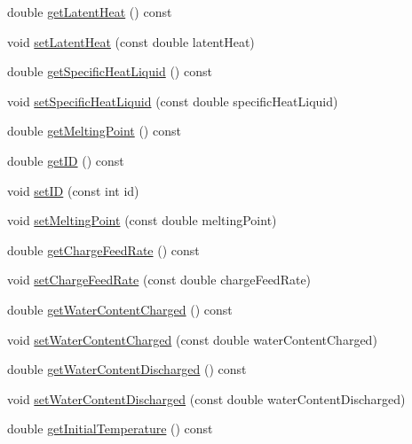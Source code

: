 \begin{DoxyCompactItemize}
double \hyperlink{class_solid_load_charge_material_add60191bd282a9cefa4bf7a60301711b}{get\+Latent\+Heat} () const
\item 
void \hyperlink{class_solid_load_charge_material_ac7361119ab7cc352dfbdc6fcb9175981}{set\+Latent\+Heat} (const double latent\+Heat)
\item 
double \hyperlink{class_solid_load_charge_material_a8b02308194b603276df3a894c401e923}{get\+Specific\+Heat\+Liquid} () const
\item 
void \hyperlink{class_solid_load_charge_material_a91fad347bf52a4f6695c304904091797}{set\+Specific\+Heat\+Liquid} (const double specific\+Heat\+Liquid)
\item 
double \hyperlink{class_solid_load_charge_material_a4be001f6e6ecbd2ad0ae1d154559cdb0}{get\+Melting\+Point} () const
\item 
double \hyperlink{class_solid_load_charge_material_ae34ce5c6f1f362340ead0748aaf885b8}{get\+ID} () const
\item 
void \hyperlink{class_solid_load_charge_material_a4cc8e12ffb340c94106cecf576a85ae5}{set\+ID} (const int id)
\item 
void \hyperlink{class_solid_load_charge_material_a6c235b1c49be98b02829d37af9c38cb2}{set\+Melting\+Point} (const double melting\+Point)
\item 
double \hyperlink{class_solid_load_charge_material_af6f018c5d67e94d86f2f57fecaa32b5c}{get\+Charge\+Feed\+Rate} () const
\item 
void \hyperlink{class_solid_load_charge_material_adc50117256b714789f68097437ca658d}{set\+Charge\+Feed\+Rate} (const double charge\+Feed\+Rate)
\item 
double \hyperlink{class_solid_load_charge_material_a2f99a8553d12b45bad53acc14338199a}{get\+Water\+Content\+Charged} () const
\item 
void \hyperlink{class_solid_load_charge_material_abf43422318a1b9120dff1dcfb15d5265}{set\+Water\+Content\+Charged} (const double water\+Content\+Charged)
\item 
double \hyperlink{class_solid_load_charge_material_aeeb6b341a6b5770155b85264dabbd1a7}{get\+Water\+Content\+Discharged} () const
\item 
void \hyperlink{class_solid_load_charge_material_a5104ddb43af977a751b90a0bc844d83d}{set\+Water\+Content\+Discharged} (const double water\+Content\+Discharged)
\item 
double \hyperlink{class_solid_load_charge_material_ae5d7f198fb1d4a3adb0cfc911a13ea06}{get\+Initial\+Temperature} () const
\item 

\end{DoxyCompactItemize}
